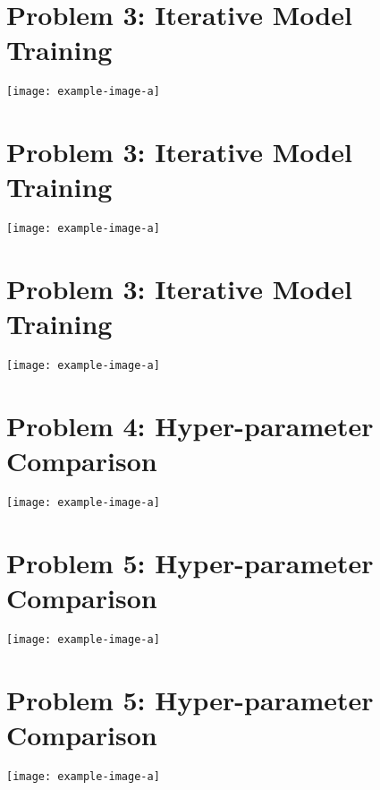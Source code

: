 \documentclass{article}
\begin{document}
\section{Problem 3: Iterative Model Training}
\begin{answer}[title=Plot 1,height=9.5cm,width=\linewidth]
\centering
\texttt{[image: example-image-a]}
\end{answer}

\section{Problem 3: Iterative Model Training}
\begin{answer}[title=Plot 2,height=9.5cm,width=\linewidth]
\centering
\texttt{[image: example-image-a]}
\end{answer}

\section{Problem 3: Iterative Model Training}
\begin{answer}[title=Plot 3,height=9.5cm,width=\linewidth]
\centering
\texttt{[image: example-image-a]}
\end{answer}

\section{Problem 4: Hyper-parameter Comparison}
\begin{answer}[title=Plot 1,height=9.5cm,width=\linewidth]
\centering
\texttt{[image: example-image-a]}
\end{answer}


\section{Problem 5: Hyper-parameter Comparison}
\begin{answer}[title=Plot 2,height=9.5cm,width=\linewidth]
\centering
\texttt{[image: example-image-a]}
\end{answer}

\section{Problem 5: Hyper-parameter Comparison}
\begin{answer}[title=Plot 3,height=9.5cm,width=\linewidth]
\centering
\texttt{[image: example-image-a]}
\end{answer}
\end{document}
